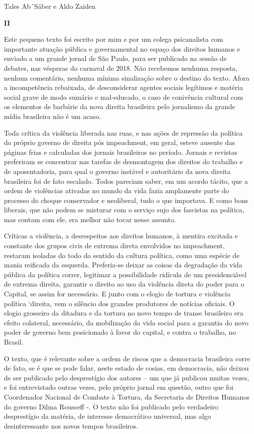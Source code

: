 Tales Ab´Sáber e Aldo Zaiden

\textbf{II}

Este pequeno texto foi escrito por mim e por um colega psicanalista com
importante atuação pública e governamental no espaço dos direitos
humanos e enviado a um grande jornal de São Paulo, para ser publicado na
sessão de debates, nas vésperas do carnaval de 2018. Não recebemos
nenhuma resposta, nenhum comentário, nenhuma mínima sinalização sobre o
destino do texto. Afora a incompetência rebaixada, de desconsiderar
agentes sociais legítimos e matéria social grave de modo sumário e
mal-educado, o caso de conivência cultural com os elementos de barbárie
da nova direita brasileira pelo jornalismo da grande mídia brasileira
não é um acaso.

Toda crítica da violência liberada nas ruas, e nas ações de repressão da
política do próprio governo de direita pós impeachment, em geral, esteve
ausente das páginas frias e calculadas dos jornais brasileiros no
período. Jornais e revistas preferiram se concentrar nas tarefas de
desmontagem dos direitos do trabalho e de aposentadoria, para qual o
governo instável e autoritário da nova direita brasileira foi de fato
escalado. Todos pareciam saber, em um acordo tácito, que a ordem de
violências ativadas no mundo da vida fazia amplamente parte do processo
do choque conservador e neoliberal, tudo o que importava. E como bons
liberais, que não podem se misturar com o serviço sujo dos fascistas na
política, mas contam com ele, era melhor não tocar nesse assunto.

Críticas a violência, a desrespeitos aos direitos humanos, à mentira
excitada e constante dos grupos civis de extrema direta envolvidos no
impeachment, restaram isoladas do todo do sentido da cultura política,
como uma espécie de mania reificada da esquerda. Preferia-se deixar as
coisas da degradação da vida pública da política correr, legitimar a
possibilidade ridícula de um presidenciável de extrema direita, garantir
o direito ao uso da violência direta do poder para o Capital, se assim
for necessário. E junto com o elogio de tortura e violência política
`direita, vem o silêncio dos grandes produtores de notícias oficiais. O
elogio grosseiro da ditadura e da tortura no novo tempo de transe
brasileiro era efeito colateral, necessário, da mobilização da vida
social para a garantia do novo poder de governo bem posicionado à favor
do capital, e contra o trabalho, no Brasil.

O texto, que é relevante sobre a ordem de riscos que a democracia
brasileira corre de fato, se é que se pode falar, neste estado de
cosias, em democracia, não deixou de ser publicado pelo desprestígio dos
autores -- um que já publicou muitas vezes, e foi entrevistado outras
vezes, pelo próprio jornal em questão, outro que foi Coordenador
Nacional de Combate à Tortura, da Secretaria de Direitos Humanos do
governo Dilma Rousseff -. O texto não foi publicado pelo verdadeiro
desprestígio da matéria, de interesse democrático universal, mas algo
desinteressante nos novos tempos brasileiros.

